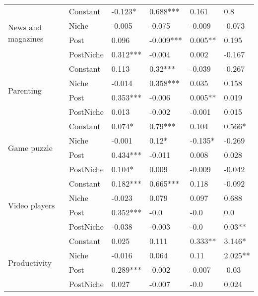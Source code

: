 \begin{longtable}[h!]{llllll}
\cline{1-6}
\multirow{4}{*}{News and magazines} & Constant &             -0.123* &    0.688*** &      0.161 &        0.8 \\
          & Niche &              -0.005 &      -0.075 &     -0.009 &     -0.073 \\
          & Post &               0.096 &   -0.009*** &    0.005** &      0.195 \\
          & PostNiche &            0.312*** &      -0.004 &      0.002 &     -0.167 \\
\cline{1-6}
\multirow{4}{*}{Parenting} & Constant &               0.113 &     0.32*** &     -0.039 &     -0.267 \\
          & Niche &              -0.014 &    0.358*** &      0.035 &      0.158 \\
          & Post &            0.353*** &      -0.006 &    0.005** &      0.019 \\
          & PostNiche &               0.013 &      -0.002 &     -0.001 &      0.015 \\
\cline{1-6}
\multirow{4}{*}{Game puzzle} & Constant &              0.074* &     0.79*** &      0.104 &     0.566* \\
          & Niche &              -0.001 &       0.12* &    -0.135* &     -0.269 \\
          & Post &            0.434*** &      -0.011 &      0.008 &      0.028 \\
          & PostNiche &              0.104* &       0.009 &     -0.009 &     -0.042 \\
\cline{1-6}
\multirow{4}{*}{Video players} & Constant &            0.182*** &    0.665*** &      0.118 &     -0.092 \\
          & Niche &              -0.023 &       0.079 &      0.097 &      0.688 \\
          & Post &            0.352*** &        -0.0 &       -0.0 &        0.0 \\
          & PostNiche &              -0.038 &      -0.003 &       -0.0 &     0.03** \\
\cline{1-6}
\multirow{4}{*}{Productivity} & Constant &               0.025 &       0.111 &    0.333** &     3.146* \\
          & Niche &              -0.016 &       0.064 &       0.11 &    2.025** \\
          & Post &            0.289*** &      -0.002 &     -0.007 &      -0.03 \\
          & PostNiche &               0.027 &      -0.007 &       -0.0 &      0.024 \\

\end{longtable}
